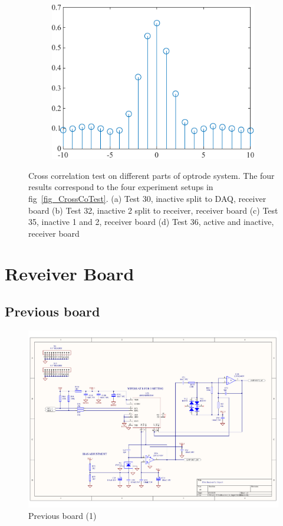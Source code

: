 \begin{figure}[H]
\begin{subfigure}{.5\textwidth}
  \caption{}
  \label{fig_CrossCorrelation35}
\end{subfigure}%
\begin{subfigure}{.5\textwidth}
  \centering
  \includegraphics[width=0.8\linewidth]{4-ANC_Sys/CrossCorrelation 36.pdf}
  \caption{}
  \label{fig_CrossCorrelation36}
\end{subfigure}
\caption{Cross correlation test on different parts of optrode system. The four results correspond to the four experiment setups in fig~\ref{fig_CrossCoTest}. (a) Test 30, inactive split to DAQ, receiver board (b) Test 32, inactive 2 split to receiver, receiver board (c) Test 35, inactive 1 and 2, receiver board (d) Test 36, active and inactive, receiver board}
\label{fig_CrossCorrelationTest}
\end{figure}



\section{Reveiver Board}

\subsection{Previous board}

\begin{figure}[H]
\centering
\includegraphics[width=0.9\linewidth]{4-ANC_Sys/FibreReceiver_3c_Input1.pdf}
\caption{Previous board (1)}
\label{fig_DavidBoardIn}
\end{figure}

